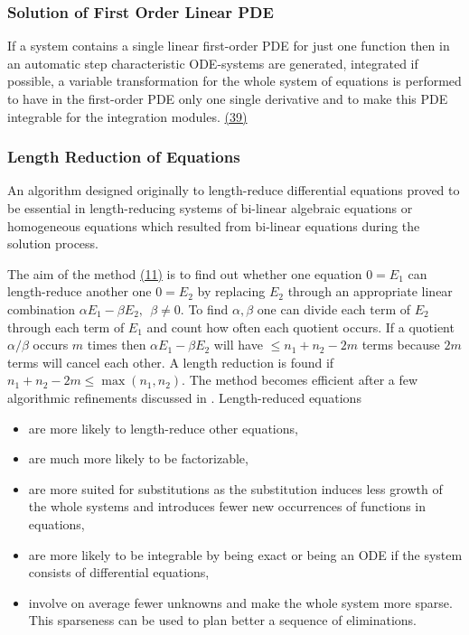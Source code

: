 \subsubsection{Solution of First Order Linear PDE}

If a system contains a single linear first-order PDE for just one
function then in an automatic step characteristic ODE-systems are
generated, integrated if possible, a variable transformation for the
whole system of equations is performed to have in the first-order PDE
only one single derivative and to make this PDE integrable for the
integration modules.  \hyperlink{crack-m_39}{(39)}

\subsubsection{Length Reduction of Equations}

An algorithm designed originally to length-reduce differential
equations proved to be essential in length-reducing systems of
bi-linear algebraic equations or homogeneous equations which resulted
from bi-linear equations during the solution process.

The aim of the method \hyperlink{crack-m_11}{(11)} is to find out
whether one equation $0=E_1$ can length-reduce another one $0=E_2$ by
replacing $E_2$ through an appropriate linear combination $\alpha E_1
- \beta E_2,\ \ \beta \neq 0$.  To find $\alpha, \beta$ one can divide
each term of $E_2$ through each term of $E_1$ and count how often each
quotient occurs.  If a quotient $\alpha/\beta$ occurs $m$ times then
$\alpha E_1 - \beta E_2$ will have $\leq n_1+n_2-2m$ terms because
$2m$ terms will cancel each other.  A length reduction is found if
$n_1+n_2-2m\leq\max(n_1,n_2)$.  The method becomes efficient after a
few algorithmic refinements discussed in \cite{Wolf:2002}.
Length-reduced equations
\begin{itemize}
\item are more likely to length-reduce other equations,
\item are much more likely to be factorizable,
\item are more suited for substitutions as the substitution induces
  less growth of the whole systems and introduces fewer new occurrences
  of functions in equations,
\item are more likely to be integrable by being exact or being an ODE
  if the system consists of differential equations,
\item involve on average fewer unknowns and make the whole system more
  sparse.  This sparseness can be used to plan better a sequence of
  eliminations.
\end{itemize}

